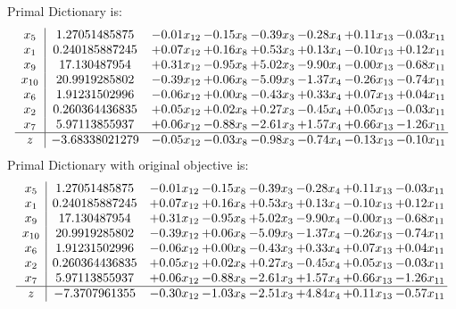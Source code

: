 \documentclass[9pt]{article}
\begin{document}
Primal Dictionary is:
\[\begin{array}{c| c c@{\hskip 2pt} c@{\hskip 2pt} c@{\hskip 2pt} c@{\hskip 2pt} c@{\hskip 2pt} c@{\hskip 2pt} }
 x_{5}   &  1.27051485875 & -0.01 x_{12} & -0.15 x_{8} & -0.39 x_{3} & -0.28 x_{4} & +  0.11 x_{13} & -0.03 x_{11}\\
 x_{1}   &  0.240185887245 & +  0.07 x_{12} & +  0.16 x_{8} & +  0.53 x_{3} & +  0.13 x_{4} & -0.10 x_{13} & +  0.12 x_{11}\\
 x_{9}   &  17.130487954 & +  0.31 x_{12} & -0.95 x_{8} & +  5.02 x_{3} & -9.90 x_{4} & -0.00 x_{13} & -0.68 x_{11}\\
 x_{10}   &  20.9919285802 & -0.39 x_{12} & +  0.06 x_{8} & -5.09 x_{3} & -1.37 x_{4} & -0.26 x_{13} & -0.74 x_{11}\\
 x_{6}   &  1.91231502996 & -0.06 x_{12} & +  0.00 x_{8} & -0.43 x_{3} & +  0.33 x_{4} & +  0.07 x_{13} & +  0.04 x_{11}\\
 x_{2}   &  0.260364436835 & +  0.05 x_{12} & +  0.02 x_{8} & +  0.27 x_{3} & -0.45 x_{4} & +  0.05 x_{13} & -0.03 x_{11}\\
 x_{7}   &  5.97113855937 & +  0.06 x_{12} & -0.88 x_{8} & -2.61 x_{3} & +  1.57 x_{4} & +  0.66 x_{13} & -1.26 x_{11}\\
\hline
z    &  -3.68338021279 & -0.05 x_{12} & -0.03 x_{8} & -0.98 x_{3} & -0.74 x_{4} & -0.13 x_{13} & -0.10 x_{11}\\
\end{array}\]
Primal Dictionary with original objective is:
\[\begin{array}{c| c c@{\hskip 2pt} c@{\hskip 2pt} c@{\hskip 2pt} c@{\hskip 2pt} c@{\hskip 2pt} c@{\hskip 2pt} }
 x_{5}   &  1.27051485875 & -0.01 x_{12} & -0.15 x_{8} & -0.39 x_{3} & -0.28 x_{4} & +  0.11 x_{13} & -0.03 x_{11}\\
 x_{1}   &  0.240185887245 & +  0.07 x_{12} & +  0.16 x_{8} & +  0.53 x_{3} & +  0.13 x_{4} & -0.10 x_{13} & +  0.12 x_{11}\\
 x_{9}   &  17.130487954 & +  0.31 x_{12} & -0.95 x_{8} & +  5.02 x_{3} & -9.90 x_{4} & -0.00 x_{13} & -0.68 x_{11}\\
 x_{10}   &  20.9919285802 & -0.39 x_{12} & +  0.06 x_{8} & -5.09 x_{3} & -1.37 x_{4} & -0.26 x_{13} & -0.74 x_{11}\\
 x_{6}   &  1.91231502996 & -0.06 x_{12} & +  0.00 x_{8} & -0.43 x_{3} & +  0.33 x_{4} & +  0.07 x_{13} & +  0.04 x_{11}\\
 x_{2}   &  0.260364436835 & +  0.05 x_{12} & +  0.02 x_{8} & +  0.27 x_{3} & -0.45 x_{4} & +  0.05 x_{13} & -0.03 x_{11}\\
 x_{7}   &  5.97113855937 & +  0.06 x_{12} & -0.88 x_{8} & -2.61 x_{3} & +  1.57 x_{4} & +  0.66 x_{13} & -1.26 x_{11}\\
\hline
z    &  -7.3707961355 & -0.30 x_{12} & -1.03 x_{8} & -2.51 x_{3} & +  4.84 x_{4} & +  0.11 x_{13} & -0.57 x_{11}\\
\end{array}\]
\end{document}
